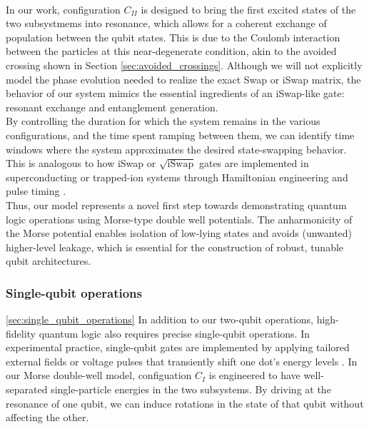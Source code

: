 \documentclass{subfiles}
\begin{document}
\\
In our work, configuration $C_{II}$ is designed to bring the first excited states of the two subsystmems into resonance, which allows for a coherent exchange of population between the qubit states. This is due to the Coulomb interaction between the particles at this near-degenerate condition, akin to the avoided crossing shown in Section \ref{sec:avoided_crossings}. Although we will not explicitly model the phase evolution needed to realize the exact Swap or iSwap matrix, the behavior of our system mimics the essential ingredients of an iSwap-like gate: resonant exchange and entanglement generation. \\
By controlling the duration for which the system remains in the various configurations, and the time spent ramping between them, we can identify time windows where the system approximates the desired state-swapping behavior. This is analogous to how iSwap or $\sqrt{\text{iSwap}}$ gates are implemented in superconducting or trapped-ion systems through Hamiltonian engineering and pulse timing \cite{picard2025entanglement}. \\

Thus, our model represents a novel first step towards demonstrating quantum logic operations using Morse-type double well potentials. The anharmonicity of the Morse potential enables isolation of low-lying states and avoids (unwanted) higher-level leakage, which is essential for the construction of robust, tunable qubit architectures\cite{nielsen2010quantum}.

\subsubsection*{Single-qubit operations}\ref{sec:single_qubit_operations}
In addition to our two-qubit operations, high-fidelity quantum logic also requires precise single-qubit operations.  In experimental practice, single-qubit gates are implemented by applying tailored external fields or voltage pulses that transiently shift one dot's energy levels \cite{mcdermott2014accurate}. In our Morse double-well model, configuation $C_I$ is engineered to have well-separated single-particle energies in the two subsystems. By driving at the resonance of one qubit, we can induce rotations in the state of that qubit without affecting the other. 
\end{document}

